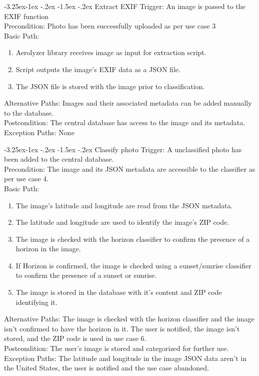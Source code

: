\documentclass[journal,10pt,draftclsnofoot,onecolumn]{IEEEtran}
\makeatletter
\renewcommand\subsubsection{\@startsection{subsubsection}{3}{\z@}
                                     {-3.25ex\@plus -1ex \@minus -.2ex}
                                     {-1.5ex \@plus -.2ex}
                                     {\normalfont\normalsize\bfseries}}
\makeatother
\begin{document}
\begin{singlespace}
		\subsubsection{Extract EXIF}
			Trigger: An image is passed to the EXIF function\\
			Precondition: Photo has been successfully uploaded as per use case 3\\
			Basic Path:
			\begin{enumerate} 
				\item Aerolyzer library receives image as input for extraction script.
				\item Script outputs the image's EXIF data as a JSON file.
				\item The JSON file is stored with the image prior to classification.
			\end{enumerate}
			Alternative Paths: Images and their associated metadata can be added manually to the database.\\
			Postcondition: The central database has access to the image and its metadata.\\
			Exception Paths: None
		
		\subsubsection{Classify photo}
			Trigger: A unclassified photo has been added to the central database.\\
			Precondition: The image and its JSON metadata are accessible to the classifier as per use case 4.\\
			Basic Path:
			\begin{enumerate}
				\item The image's latitude and longitude are read from the JSON metadata.
				\item The latitude and longitude are used to identify the image's ZIP code.
				\item The image is checked with the horizon classifier to confirm the presence of a horizon in the image.
				\item If Horizon is confirmed, the image is checked using a sunset/sunrise classifier to confirm the presence of a sunset or sunrise.
				\item The image is stored in the database with it's content and ZIP code identifying it.
			\end{enumerate}
			Alternative Paths: The image is checked with the horizon classifier and the image isn't confirmed to have the horizon in it. The user is notified, the image isn't stored, and the ZIP code is used in use case 6.\\
			Postcondition: The user's image is stored and categorized for further use.\\
			Exception Paths: The latitude and longitude in the image JSON data aren't in the United States, the user is notified and the use case abandoned.
		

\end{singlespace}
\end{document}
